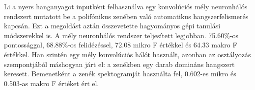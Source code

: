Li \cite{li2015automatic} a nyers hanganyagot inputként felhasználva egy konvolúciós mély neuronhálós rendszert mutatott be a polifónikus zenében való automatikus hangszerfelismerés kapcsán. Ezt a megoldást aztán összevetette hagyományos gépi tanulási módszerekkel is. A mély neuronhálós rendszer teljesített legjobban. 75.60\%-os pontossággal, 68.88\%-os felidézéssel, 72.08 mikro F értékkel és 64.33 makro F értékkel. Han \cite{han2016deep} szintén egy mély konvolúciós hálót használt, azonban az osztályozás szempontjából máshogyan járt el: a zenékben egy darab domináns hangszert keresett. Bemenetként a zenék spektogramját használta fel, 0.602-es mikro és 0.503-as makro F értéket ért el.